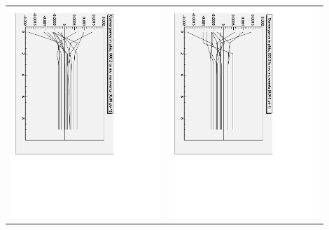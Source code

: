 \documentclass[compress]{beamer}
\begin{document}
\begin{frame}
\begin{center}
\begin{tabular}{p{0.45\linewidth} p{0.45\linewidth}}
\includegraphics[height=\linewidth, angle=90]{phiz_conv_500.pdf} &
\includegraphics[height=\linewidth, angle=90]{phiz_conv_250.pdf}
\end{tabular}
\end{center}
\end{frame}
\end{document}
